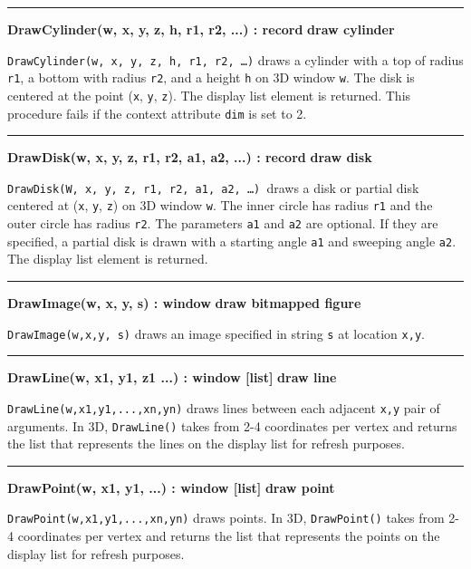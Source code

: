 \bigskip\hrule\vspace{0.1cm}
\noindent
{\bf DrawCylinder(w, x, y, z, h, r1, r2, ...) : record } \hfill {\bf draw cylinder}

\noindent
\texttt{DrawCylinder(w, x, y, z, h, r1, r2, {\dots})} draws a cylinder
with a top of radius \texttt{r1}, a bottom with radius \texttt{r2}, and
a height \texttt{h} on 3D window \texttt{w}. The disk is centered at
the point (\texttt{x}, \texttt{y}, \texttt{z}). The display list
element is returned. This procedure fails if the context attribute
\texttt{dim} is set to 2.

\bigskip\hrule\vspace{0.1cm}
\noindent
{\bf DrawDisk(w, x, y, z, r1, r2, a1, a2, ...) : record } \hfill {\bf draw disk}

\noindent
\texttt{DrawDisk(W, x, y, z, r1, r2, a1, a2, {\dots})}\texttt{ }draws a
disk or partial disk centered at (\texttt{x}, \texttt{y}, \texttt{z})
on 3D window \texttt{w}. The inner circle has radius \texttt{r1} and
the outer circle has radius \texttt{r2}. The parameters \texttt{a1} and
\texttt{a2} are optional. If they are specified, a partial disk is
drawn with a starting angle \texttt{a1} and sweeping angle \texttt{a2}.
The display list element is returned.

\bigskip\hrule\vspace{0.1cm}
\noindent
{\bf DrawImage(w, x, y, s) : window } \hfill {\bf draw bitmapped figure}

\noindent
\texttt{DrawImage(w,x,y, s)} draws an image specified in string
\texttt{s} at location \texttt{x,y}.

\bigskip\hrule\vspace{0.1cm}
\noindent
{\bf DrawLine(w, x1, y1, z1 ...) : window [list] } \hfill {\bf draw line}

\noindent
\texttt{DrawLine(w,x1,y1,...,xn,yn)} draws lines between each adjacent
\texttt{x,y} pair of arguments. In 3D, \texttt{DrawLine()} takes from
2-4 coordinates per vertex and returns the list that represents the
lines on the display list for refresh purposes.

\bigskip\hrule\vspace{0.1cm}
\noindent
{\bf DrawPoint(w, x1, y1, ...) : window [list] } \hfill {\bf draw point}

\noindent
\texttt{DrawPoint(w,x1,y1,...,xn,yn)} draws points. In 3D,
\texttt{DrawPoint()} takes from 2-4 coordinates per vertex and returns
the list that represents the points on the display list for refresh
purposes.

